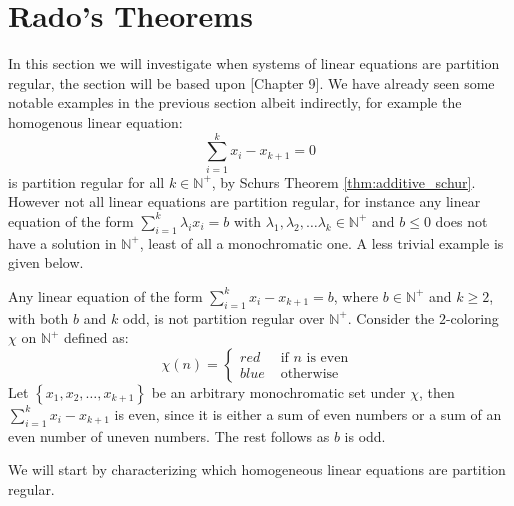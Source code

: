 \section{Rado's Theorems}
In this section we will investigate when systems of linear equations are partition regular, the section will be based upon \cite{rtoi}[Chapter 9]. We have already seen some notable examples in the previous section albeit indirectly, for example the homogenous linear equation:
\begin{equation*}
	\sum_{i = 1}^k x_i - x_{k + 1} = 0
\end{equation*}
is partition regular for all $k \in \mathbb{N}^{+}$, by Schurs Theorem \ref{thm:additive_schur}. However not all linear equations are partition regular, for instance any linear equation of the form $\sum_{i = 1}^k \lambda_i x_i = b$ with $\lambda_1, \lambda_2, \ldots \lambda_k \in \mathbb{N}^+$ and $b \leq 0$ does not have a solution in $\mathbb{N}^{+}$, least of all a monochromatic one. A less trivial example is given below.

\begin{example}\label{exmp:less_trivial_example}
	Any linear equation of the form $\sum_{i = 1}^{k} x_i - x_{k + 1} = b$, where $b \in \mathbb{N}^{+}$ and $k \geq 2$, with both $b$ and $k$ odd, is not partition regular over $\mathbb{N}^+$. Consider the $2$-coloring $\chi$ on $\mathbb{N}^{+}$ defined as:
	\begin{equation*}
		\chi(n) = \begin{cases}
			red  & \text{ if } n \text{ is even } \\
			blue & \text{ otherwise }
		\end{cases}
	\end{equation*}
	Let $\left\{x_1, x_2, \ldots, x_{k + 1}\right\}$ be an arbitrary monochromatic set under $\chi$, then $\sum_{i = 1}^k x_{i} - x_{k + 1}$ is even, since it is either a sum of even numbers or a sum of an even number of uneven numbers. The rest follows as $b$ is odd.
\end{example}
We will start by characterizing which homogeneous linear equations are partition regular.

